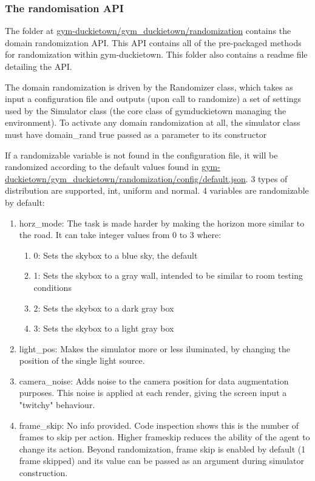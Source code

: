 \documentclass[12pt]{article}
\begin{document}
\subsubsection{The randomisation API}
The folder at \url{gym-duckietown/gym_duckietown/randomization} contains the domain randomization API. This API contains all of the pre-packaged methods for randomization within gym-duckietown. This folder also contains a readme file detailing the API.

The domain randomization is driven by the Randomizer class, which takes as input a configuration file and outputs (upon call to randomize) a set of settings used by the Simulator class (the core class of gym\-duckietown managing the environment). To activate any domain randomization at all, the simulator class must have domain\_rand \= true passed as a parameter to its constructor

If a randomizable variable is not found in the configuration file, it will be randomized according to the default values found in \url{gym-duckietown/gym_duckietown/randomization/config/default.json}. 3 types of distribution are supported, int, uniform and normal. 4 variables are randomizable by default:
\begin{enumerate}
    \item horz\_mode: The task is made harder by making the horizon more similar to the road. It can take integer values from 0 to 3 where:
    \begin{enumerate}
        \item 0: Sets the skybox to a blue sky, the default
        \item 1: Sets the skybox to a gray wall, intended to be similar to room testing conditions
        \item 2: Sets the skybox to a dark gray box
        \item 3: Sets the skybox to a light gray box
    \end{enumerate}
    \item light\_pos: Makes the simulator more or less iluminated, by changing the position of the single light source.
    \item camera\_noise: Adds noise to the camera position for data augmentation purposes. This noise is applied at each render, giving the screen input a "twitchy" behaviour.
    \item frame\_skip: No info provided. Code inspection shows this is the number of frames to skip per action. Higher frameskip reduces the ability of the agent to change its action. Beyond randomization, frame skip is enabled by default (1 frame skipped) and its value can be passed as an argument during simulator construction.
\end{enumerate}
\end{document}
